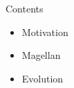 \begin{frame}
  \titlepage
\end{frame}

\begin{frame}{Contents}
    \begin{itemize}
    \item \alert{Motivation}
    \item \alert{Magellan}
    \item \alert{Evolution}
    \end{itemize}
\end{frame}